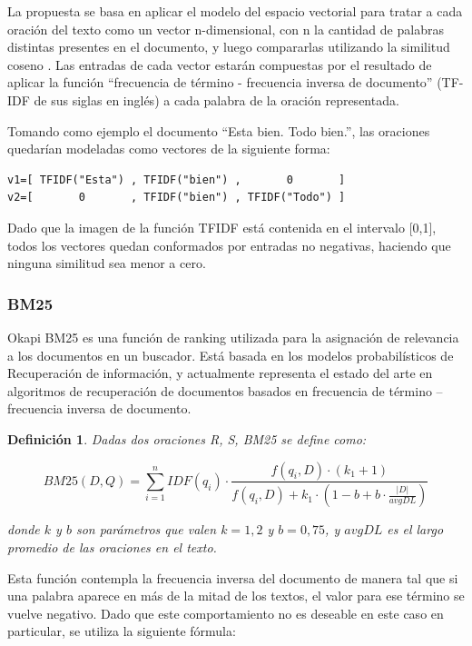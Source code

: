 \documentclass{llncs}
\newtheorem{definicion}{Definición}
\begin{document}
La propuesta se basa en aplicar el modelo del espacio vectorial para tratar a cada oración del texto como un vector n-dimensional, con n la cantidad de palabras distintas presentes en el documento, y luego compararlas utilizando la similitud coseno . Las entradas de cada vector estarán compuestas por el resultado de aplicar la función “frecuencia de término - frecuencia inversa de documento” (TF-IDF de sus siglas en inglés) a cada palabra de la oración representada.

Tomando como ejemplo el documento “Esta bien. Todo bien.”, las oraciones quedarían modeladas como vectores de la siguiente forma:

\begin{Verbatim}[xleftmargin=3em]
v1=[ TFIDF("Esta") , TFIDF("bien") ,       0       ]
v2=[       0       , TFIDF("bien") , TFIDF("Todo") ]
\end{Verbatim}

Dado que la imagen de la función TFIDF está contenida en el intervalo [0,1], todos los vectores quedan conformados por entradas no negativas, haciendo que ninguna similitud sea menor a cero. 


\subsubsection{BM25}
Okapi BM25 es una función de ranking utilizada para la asignación de relevancia a los documentos en un buscador. 
Está basada en los modelos probabilísticos de Recuperación de información, y actualmente 
representa el estado del arte en algoritmos de recuperación de documentos 
basados en frecuencia de término -- frecuencia inversa de documento.

\begin{definicion}
Dadas dos oraciones R, S, BM25 se define como:

\begin{equation}
BM25(D,Q) = \sum_{i=1}^{n} IDF(q_i) \cdot \frac{f(q_i, D) \cdot (k_1 + 1)}{f(q_i, D) + k_1 \cdot (1 - b + b \cdot \frac{|D|}{avgDL})}
\end{equation}

donde $k$ y $b$ son parámetros que valen $k = 1,2$ y $b = 0,75$, y $avgDL$ es el largo promedio de las oraciones en el texto.
\end{definicion}

Esta función contempla la frecuencia inversa del documento de manera tal que si una palabra aparece en más de la mitad de los textos, el valor para ese término se vuelve negativo. Dado que este comportamiento no es deseable en este caso en particular, se utiliza la siguiente fórmula:
                
\end{document}
